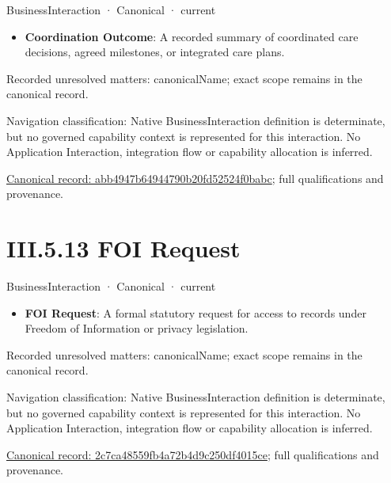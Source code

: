 \label{element:abb4947b64944790b20fd52524f0babc}
{\small BusinessInteraction · Canonical · current}\par

\begin{itemize}


\item \textbf{Coordination Outcome}: A recorded summary of coordinated care decisions, agreed milestones, or integrated care plans.

\end{itemize}

{\small Recorded unresolved matters: canonicalName; exact scope remains in the canonical record.}\par
{\small Navigation classification: Native BusinessInteraction definition is determinate, but no governed capability context is represented for this interaction. No Application Interaction, integration flow or capability allocation is inferred.}\par
{\footnotesize \href{../../../../continuum/business/business-interaction/abb4947b64944790b20fd52524f0babc.md}{Canonical record: abb4947b64944790b20fd52524f0babc}; full qualifications and provenance.}\par
\section*{III.5.13 FOI Request}
\label{navigation:III.5.13}

\label{element:2c7ca48559fb4a72b4d9c250df4015ce}
{\small BusinessInteraction · Canonical · current}\par

\begin{itemize}


\item \textbf{FOI Request}: A formal statutory request for access to records under Freedom of Information or privacy legislation.

\end{itemize}

{\small Recorded unresolved matters: canonicalName; exact scope remains in the canonical record.}\par
{\small Navigation classification: Native BusinessInteraction definition is determinate, but no governed capability context is represented for this interaction. No Application Interaction, integration flow or capability allocation is inferred.}\par
{\footnotesize \href{../../../../continuum/business/business-interaction/2c7ca48559fb4a72b4d9c250df4015ce.md}{Canonical record: 2c7ca48559fb4a72b4d9c250df4015ce}; full qualifications and provenance.}\par
